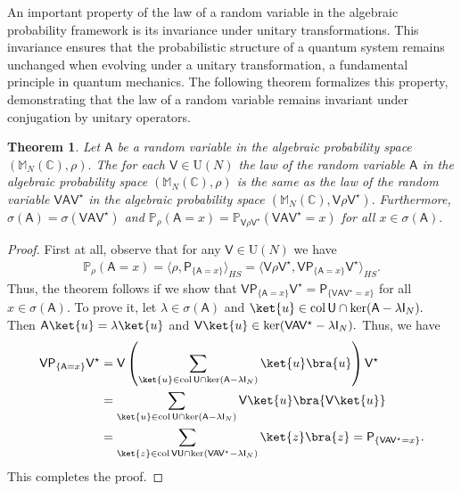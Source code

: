 \documentclass[a4paper,11pt]{article}
\newtheorem{theorem}{Theorem}[section]
\newcommand{\rI}{\mathsf{I}}
\newcommand{\rP}{\mathsf{P}}
\newcommand{\rU}{\mathsf{U}}
\newcommand{\rV}{\mathsf{V}}
\newcommand{\rA}{\mathsf{A}}
\begin{document}
An important property of the law of a random variable in the algebraic probability framework is its invariance under unitary transformations. This invariance ensures that the probabilistic structure of a quantum system remains unchanged when evolving under a unitary transformation, a fundamental principle in quantum mechanics. The following theorem formalizes this property, demonstrating that the law of a random variable remains invariant under conjugation by unitary operators.

\begin{theorem}
Let $\rA$ be a random variable in the algebraic probability space $(\mathbb{M}_N(\mathbb{C}), \rho).$ The for each $\rV \in \mathrm{U}(N)$ the law of the random variable $\rA$ in the algebraic probability space $(\mathbb{M}_N(\mathbb{C}),\rho)$ is the same as the law of the random variable $\rV\rA\rV^{\star}$ in the algebraic probability space $(\mathbb{M}_N(\mathbb{C}), \rV\rho\rV^{\star}).$ Furthermore, $\sigma(\rA) = \sigma(\rV\rA \rV^{\star})$ and $\mathbb{P}_{\rho}(\rA = x) = \mathbb{P}_{\rV\rho\rV^{\star}}(\rV\rA\rV^{\star} = x)$ for all $x \in \sigma(\rA).$
\end{theorem}
\begin{proof}
First at all, observe that for any $\rV \in \mathrm{U}(N)$ we have
\begin{align*}
\mathbb{P}_{\rho}(\rA = x) = \langle \rho,\rP_{\{\rA = x\}} \rangle_{HS} = \langle \rV\rho\rV^{\star},\rV \rP_{\{\rA = x\}} \rV^{\star} \rangle_{HS}.
\end{align*}
Thus, the theorem follows if we show that $\rV \rP_{\{\rA = x\}} \rV^{\star} = \rP_{\{\rV\rA\rV^{\star} = x\}}$ for all $x \in \sigma(\rA).$ To prove it, let $\lambda \in \sigma(\rA)$ and $\ket{u} \in \mathrm{col}\,\rU \cap \ker(\rA-\lambda \rI_N).$ Then $\rA\ket{u} = \lambda \ket{u}$ and $\rV\ket{u} \in \ker(\rV\rA\rV^{\star}-\lambda \rI_N).$ Thus, we have 
\begin{align*}
  \rV \rP_{\{\rA = x\}} \rV^{\star} & = \rV \left( 
  \sum_{\ket{u} \in \mathrm{col}\,\rU \cap \ker(\rA-\lambda \rI_N)} \ket{u}\bra{u} \right) \rV^{\star} \\
  & = \sum_{\ket{u} \in \mathrm{col}\,\rU \cap \ker(\rA-\lambda \rI_N)} \rV\ket{u}\bra{\rV\ket{u}} \\  
  & = \sum_{\ket{z} \in \mathrm{col}\,\rV\rU \cap \ker(\rV\rA \rV^* -\lambda \rI_N)} \ket{z}\bra{z}
  = \rP_{\{\rV\rA\rV^{\star} = x\}}.
\end{align*}
This completes the proof.
\end{proof}
\end{document}
